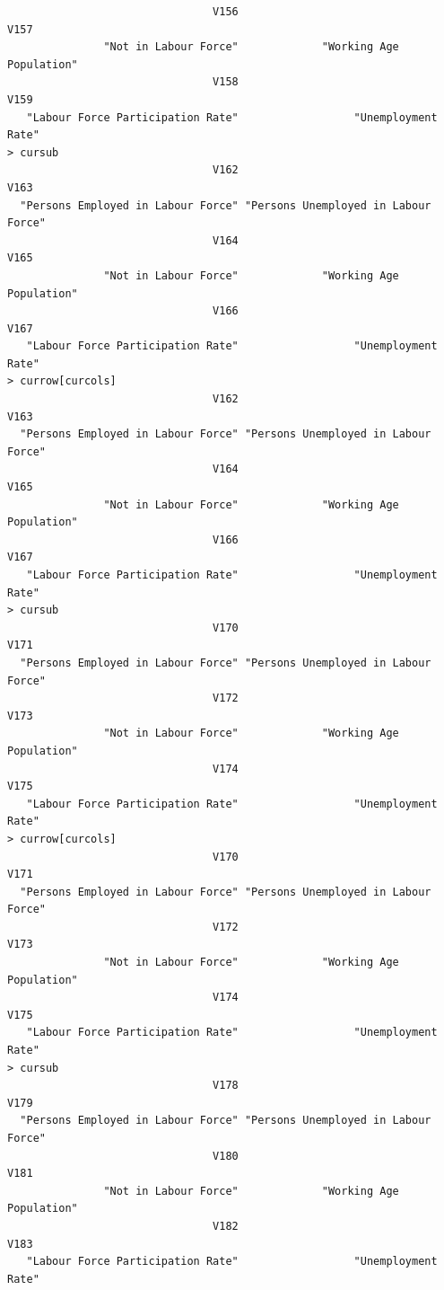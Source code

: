 \documentclass[a4paper]{article}
\begin{document}
\begin{verbatim}
                                V156                                 V157 
               "Not in Labour Force"             "Working Age Population" 
                                V158                                 V159 
   "Labour Force Participation Rate"                  "Unemployment Rate" 
> cursub 
                                V162                                 V163 
  "Persons Employed in Labour Force" "Persons Unemployed in Labour Force" 
                                V164                                 V165 
               "Not in Labour Force"             "Working Age Population" 
                                V166                                 V167 
   "Labour Force Participation Rate"                  "Unemployment Rate" 
> currow[curcols] 
                                V162                                 V163 
  "Persons Employed in Labour Force" "Persons Unemployed in Labour Force" 
                                V164                                 V165 
               "Not in Labour Force"             "Working Age Population" 
                                V166                                 V167 
   "Labour Force Participation Rate"                  "Unemployment Rate" 
> cursub 
                                V170                                 V171 
  "Persons Employed in Labour Force" "Persons Unemployed in Labour Force" 
                                V172                                 V173 
               "Not in Labour Force"             "Working Age Population" 
                                V174                                 V175 
   "Labour Force Participation Rate"                  "Unemployment Rate" 
> currow[curcols] 
                                V170                                 V171 
  "Persons Employed in Labour Force" "Persons Unemployed in Labour Force" 
                                V172                                 V173 
               "Not in Labour Force"             "Working Age Population" 
                                V174                                 V175 
   "Labour Force Participation Rate"                  "Unemployment Rate" 
> cursub 
                                V178                                 V179 
  "Persons Employed in Labour Force" "Persons Unemployed in Labour Force" 
                                V180                                 V181 
               "Not in Labour Force"             "Working Age Population" 
                                V182                                 V183 
   "Labour Force Participation Rate"                  "Unemployment Rate" 

\end{verbatim}
\end{document}
